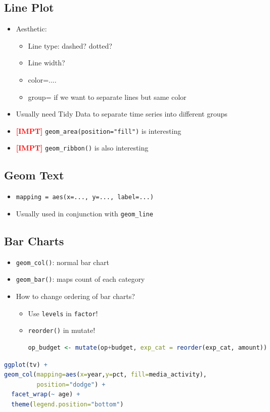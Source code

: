 \documentclass{article}
\newcommand{\impt}[0]{\textcolor{red}{\textbf{[IMPT] }}}
\begin{document}
\begin{multicols}{2}
\begin{itemize}
\begin{itemize}
	\end{itemize}
\end{itemize}

\subsection{Line Plot}
\begin{itemize}
	\item Aesthetic:
	\begin{itemize}
		\item Line type: dashed? dotted?
		\item Line width?
		\item color=....
		\item group= if we want to separate lines but same color
	\end{itemize}
    \item Usually need Tidy Data to separate time series into different groups
    \item \impt \texttt{geom\_area(position="fill")} is interesting
    \item \impt \texttt{geom\_ribbon()} is also interesting
\end{itemize}

\subsection{Geom Text}
\begin{itemize}
	\item \texttt{mapping = aes(x=..., y=..., label=...)}
	\item Usually used in conjunction with \texttt{geom\_line}
\end{itemize}
\subsection{Bar Charts}
\begin{itemize}
	\item \texttt{geom\_col()}: normal bar chart
	\item \texttt{geom\_bar()}: maps count of each category
	\item How to change ordering of bar charts?
	\begin{itemize}
		\item Use \texttt{levels} in \texttt{factor}!
		\item \texttt{reorder()} in mutate!
		\begin{lstlisting}[language=R]
op_budget <- mutate(op+budget, exp_cat = reorder(exp_cat, amount))\end{lstlisting}
	\end{itemize}
\end{itemize}
\begin{lstlisting}[language=R]
ggplot(tv) +
geom_col(mapping=aes(x=year,y=pct, fill=media_activity),
         position="dodge") +
  facet_wrap(~ age) +
  theme(legend.position="bottom")
\end{lstlisting}

\end{multicols}
\end{document}

